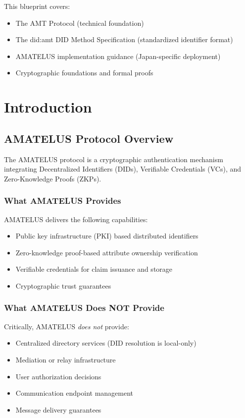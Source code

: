 This blueprint covers:
\begin{itemize}
  \item The AMT Protocol (technical foundation)
  \item The did:amt DID Method Specification (standardized identifier format)
  \item AMATELUS implementation guidance (Japan-specific deployment)
  \item Cryptographic foundations and formal proofs
\end{itemize}

\chapter{Introduction}

\section{AMATELUS Protocol Overview}

The AMATELUS protocol is a cryptographic authentication mechanism integrating Decentralized Identifiers (DIDs), Verifiable Credentials (VCs), and Zero-Knowledge Proofs (ZKPs).

\subsection{What AMATELUS Provides}

AMATELUS delivers the following capabilities:
\begin{itemize}
  \item Public key infrastructure (PKI) based distributed identifiers
  \item Zero-knowledge proof-based attribute ownership verification
  \item Verifiable credentials for claim issuance and storage
  \item Cryptographic trust guarantees
\end{itemize}

\subsection{What AMATELUS Does NOT Provide}

Critically, AMATELUS \emph{does not} provide:
\begin{itemize}
  \item Centralized directory services (DID resolution is local-only)
  \item Mediation or relay infrastructure
  \item User authorization decisions
  \item Communication endpoint management
  \item Message delivery guarantees
\end{itemize}

